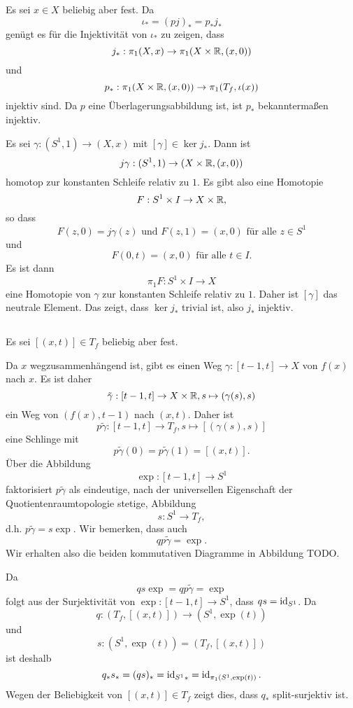 \documentclass[a4paper,10pt]{article}
\begin{document}
\subsection{}
Es sei $x \in X$ beliebig aber fest. Da
\[
 \iota_* = (pj)_* = p_* j_*
\]
genügt es für die Injektivität von $\iota_*$ zu zeigen, dass
\[
 j_* : \pi_1(X,x) \to \pi_1(X \times \mathbb{R}, (x,0))
\]
und
\[
 p_* : \pi_1(X \times \mathbb{R}, (x,0)) \to \pi_1(T_f, \iota(x))
\]
injektiv sind. Da $p$ eine Überlagerungsabbildung ist, ist $p_*$ bekanntermaßen injektiv.

Es sei $\gamma : (S^1,1) \to (X,x)$ mit $[\gamma] \in \ker j_*$. Dann ist
\[
 j \gamma : (S^1,1) \to (X \times \mathbb{R}, (x,0))
\]
homotop zur konstanten Schleife relativ zu $1$. Es gibt also eine Homotopie
\[
 F : S^1 \times I \to X \times \mathbb{R},
\]
so dass
\[
 F(z,0) = j\gamma(z) \text{ und } F(z,1) = (x,0) \text{ für alle } z \in S^1
\]
und
\[
 F(0,t) = (x,0) \text{ für alle } t \in I.
\]
Es ist dann
\[
 \pi_1 F : S^1 \times I \to X
\]
eine Homotopie von $\gamma$ zur konstanten Schleife relativ zu $1$. Daher ist $[\gamma]$ das neutrale Element. Das zeigt, dass $\ker j_*$ trivial ist, also $j_*$ injektiv.


\subsection{}
Es sei $[(x,t)] \in T_f$ beliebig aber fest.

Da $x$ wegzusammenhängend ist, gibt es einen Weg $\gamma : [t-1,t] \to X$ von $f(x)$ nach $x$. Es ist daher
\[
 \tilde{\gamma} : [t-1,t] \to X \times \mathbb{R}, s \mapsto (\gamma(s),s)
\]
ein Weg von $(f(x),t-1)$ nach $(x,t)$. Daher ist
\[
 p \tilde{\gamma} : [t-1,t] \to T_f, s \mapsto [(\gamma(s),s)]
\]
eine Schlinge mit
\[
 p\tilde{\gamma}(0) = p\tilde{\gamma}(1) = [(x,t)].
\]
Über die Abbildung
\[
 \exp : [t-1,t] \to S^1
\]
faktorisiert $p\tilde{\gamma}$ als eindeutige, nach der universellen Eigenschaft der Quotientenraumtopologie stetige, Abbildung
\[
 s : S^1 \to T_f,
\]
d.h. $p \tilde{\gamma} = s \exp$. Wir bemerken, dass auch
\[
 q p \tilde{\gamma} = \exp.
\]
Wir erhalten also die beiden kommutativen Diagramme in Abbildung TODO.

Da
\[
 q s \exp = q p \tilde{\gamma} = \exp
\]
folgt aus der Surjektivität von $\exp : [t-1,t] \to S^1$, dass $qs = \operatorname{id}_{S^1}$. Da
\[
 q : (T_f, [(x,t)]) \to (S^1, \exp(t))
\]
und
\[
 s : (S^1, \exp(t)) = (T_f, [(x,t)])
\]
ist deshalb
\[
 q_* s_* = (qs)_* = {\operatorname{id}_{S^1}}_* = \operatorname{id}_{\pi_1(S^1,\exp(t))}.
\]
Wegen der Beliebigkeit von $[(x,t)] \in T_f$ zeigt dies, dass $q_*$ split-surjektiv ist.
\end{document}
